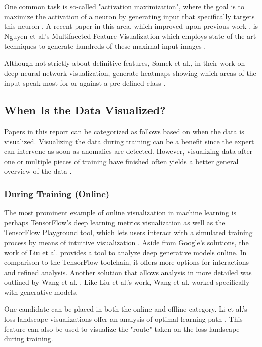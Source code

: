 \documentclass{acmsiggraph}               %
\begin{document}
One common task is so-called "activation maximization", where the goal is to maximize the activation of a neuron by generating input that specifically targets this neuron \cite{Hohman2018}. A recent paper in this area, which improved upon previous work \cite{Erhan2009}, is Nguyen et al.'s Multifaceted Feature Visualization which employs state-of-the-art techniques to generate hundreds of these maximal input images \cite{Hohman2018,Nguyen2016}. 

Although not strictly about definitive features, Samek et al., in their work on deep neural network visualization, generate heatmaps showing which areas of the input speak most for or against a pre-defined class \cite{Samek2017}.

\subsection{When Is the Data Visualized?}
Papers in this report can be categorized as follows based on when the data is visualized. Visualizing the data during training can be a benefit since the expert can intervene as soon as anomalies are detected. However, visualizing data after one or multiple pieces of training have finished often yields a better general overview of the data \cite{Hohman2018}.
\subsubsection{During Training (Online)}
The most prominent example of online visualization in machine learning is perhaps TensorFlow's deep learning metrics visualization \cite{Wongsuphasawat2018} as well as the TensorFlow Playground tool, which lets users interact with a simulated training process by means of intuitive visualization \cite{Smilkov2017}.
Aside from Google's solutions, the work of Liu et al. \cite{Liu2018} provides a tool to analyze deep generative models online. In comparison to the TensorFlow toolchain, it offers more options for interactions and refined analysis. Another solution that allows analysis in more detailed was outlined by Wang et al. \cite{Wang}. Like Liu et al.'s work, Wang et al. worked specifically with generative models.

One candidate can be placed in both the online and offline category. Li et al.'s loss landscape visualizations offer an analysis of optimal learning path \cite{Li2017}. This feature can also be used to visualize the "route" taken on the loss landscape during training.
\end{document}
